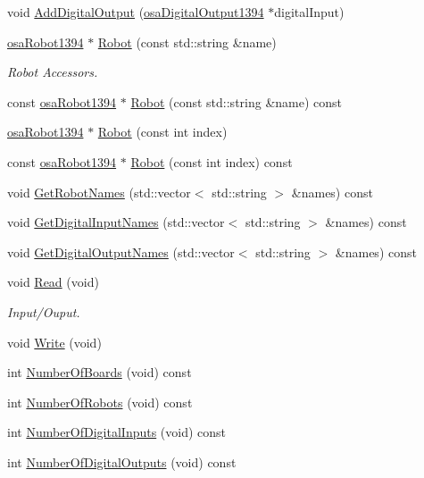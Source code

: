 \begin{DoxyCompactItemize}
void \hyperlink{classsaw_robot_i_o1394_1_1osa_port1394_a62786c3689894865ffb2dbb27c1b3946}{Add\-Digital\-Output} (\hyperlink{classsaw_robot_i_o1394_1_1osa_digital_output1394}{osa\-Digital\-Output1394} $\ast$digital\-Input)
\item 
\hyperlink{classsaw_robot_i_o1394_1_1osa_robot1394}{osa\-Robot1394} $\ast$ \hyperlink{classsaw_robot_i_o1394_1_1osa_port1394_af2f6610aeec705984041bcc435bc5dda}{Robot} (const std\-::string \&name)
\begin{DoxyCompactList}\small\item\em Robot Accessors. \end{DoxyCompactList}\item 
const \hyperlink{classsaw_robot_i_o1394_1_1osa_robot1394}{osa\-Robot1394} $\ast$ \hyperlink{classsaw_robot_i_o1394_1_1osa_port1394_abf75669ed82aabf5820c24de301fc868}{Robot} (const std\-::string \&name) const 
\item 
\hyperlink{classsaw_robot_i_o1394_1_1osa_robot1394}{osa\-Robot1394} $\ast$ \hyperlink{classsaw_robot_i_o1394_1_1osa_port1394_a9e2096e401adb5565a3314b1090c4be8}{Robot} (const int index)
\item 
const \hyperlink{classsaw_robot_i_o1394_1_1osa_robot1394}{osa\-Robot1394} $\ast$ \hyperlink{classsaw_robot_i_o1394_1_1osa_port1394_aca859be1603e6b7bf476177eec73e8d3}{Robot} (const int index) const 
\item 
void \hyperlink{classsaw_robot_i_o1394_1_1osa_port1394_a485394fb1a256776d088ced3eaa7fe73}{Get\-Robot\-Names} (std\-::vector$<$ std\-::string $>$ \&names) const 
\item 
void \hyperlink{classsaw_robot_i_o1394_1_1osa_port1394_ae38f23f3b69d049933cb56a10eb22cb2}{Get\-Digital\-Input\-Names} (std\-::vector$<$ std\-::string $>$ \&names) const 
\item 
void \hyperlink{classsaw_robot_i_o1394_1_1osa_port1394_a2f27bc0401e976ee34401607f4827fe5}{Get\-Digital\-Output\-Names} (std\-::vector$<$ std\-::string $>$ \&names) const 
\item 
void \hyperlink{classsaw_robot_i_o1394_1_1osa_port1394_a9426141a8a2a0e6392d9991cf331d8a9}{Read} (void)
\begin{DoxyCompactList}\small\item\em Input/\-Ouput. \end{DoxyCompactList}\item 
void \hyperlink{classsaw_robot_i_o1394_1_1osa_port1394_a184cfc9bef655e767a5e435bf68ae3a1}{Write} (void)
\item 
int \hyperlink{classsaw_robot_i_o1394_1_1osa_port1394_adec1e0b7a0699abc8a309412bf174e61}{Number\-Of\-Boards} (void) const 
\item 
int \hyperlink{classsaw_robot_i_o1394_1_1osa_port1394_a6618de9e761633e735240598f6cb46ee}{Number\-Of\-Robots} (void) const 
\item 
int \hyperlink{classsaw_robot_i_o1394_1_1osa_port1394_a2841337671c67505f15776cef83c127d}{Number\-Of\-Digital\-Inputs} (void) const 
\item 
int \hyperlink{classsaw_robot_i_o1394_1_1osa_port1394_ac7b6f5ba3f9c08103b3eedde877d7472}{Number\-Of\-Digital\-Outputs} (void) const 
\end{DoxyCompactItemize}

